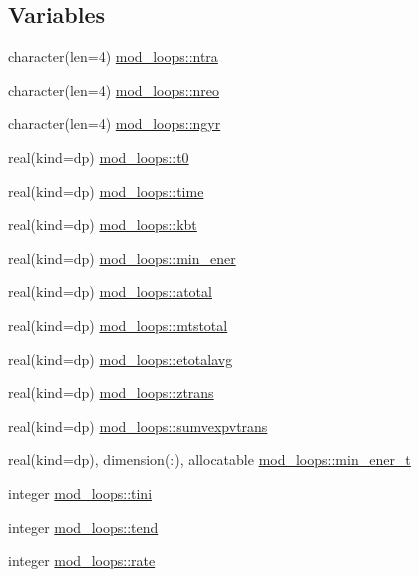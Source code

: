 \subsection*{Variables}
\begin{DoxyCompactItemize}
\item 
character(len=4) \hyperlink{namespacemod__loops_a79e040eb372f8de350337242a159e2b7}{mod\+\_\+loops\+::ntra}
\item 
character(len=4) \hyperlink{namespacemod__loops_a2ee60c7992c0befa3757b0996e34c356}{mod\+\_\+loops\+::nreo}
\item 
character(len=4) \hyperlink{namespacemod__loops_aa5002187d8846b45d30e6d3845cf1301}{mod\+\_\+loops\+::ngyr}
\item 
real(kind=dp) \hyperlink{namespacemod__loops_ab6a118712ba0b676790e9cace45c35b5}{mod\+\_\+loops\+::t0}
\item 
real(kind=dp) \hyperlink{namespacemod__loops_acb345fb5782ee4c7fd3c419baff2c135}{mod\+\_\+loops\+::time}
\item 
real(kind=dp) \hyperlink{namespacemod__loops_a28f32cc48dca88b5eb914f3b51ff36c4}{mod\+\_\+loops\+::kbt}
\item 
real(kind=dp) \hyperlink{namespacemod__loops_a17eba688dba567d251d70c4c22d9a1cb}{mod\+\_\+loops\+::min\+\_\+ener}
\item 
real(kind=dp) \hyperlink{namespacemod__loops_a16597662d980828d74a9078f4b74e677}{mod\+\_\+loops\+::atotal}
\item 
real(kind=dp) \hyperlink{namespacemod__loops_ae00fd72d753b56050294575eca6b68b1}{mod\+\_\+loops\+::mtstotal}
\item 
real(kind=dp) \hyperlink{namespacemod__loops_ad69a647146ed54f5c84b96e742396716}{mod\+\_\+loops\+::etotalavg}
\item 
real(kind=dp) \hyperlink{namespacemod__loops_a6975a502e7bc56e3b95ee8ed8db8e658}{mod\+\_\+loops\+::ztrans}
\item 
real(kind=dp) \hyperlink{namespacemod__loops_a7c4cc7b204cbf0459e4519befe2b1ef5}{mod\+\_\+loops\+::sumvexpvtrans}
\item 
real(kind=dp), dimension(\+:), allocatable \hyperlink{namespacemod__loops_a285da08b33e0b132d883ee82f39f6ea2}{mod\+\_\+loops\+::min\+\_\+ener\+\_\+t}
\item 
integer \hyperlink{namespacemod__loops_adc96eb69b7265038868c81104240ee96}{mod\+\_\+loops\+::tini}
\item 
integer \hyperlink{namespacemod__loops_a67ea99979384ac6268ae84f7bd2773ec}{mod\+\_\+loops\+::tend}
\item 
integer \hyperlink{namespacemod__loops_ab4cd7025ac3ba99baaa6d706f7c7cdb7}{mod\+\_\+loops\+::rate}
\end{DoxyCompactItemize}
